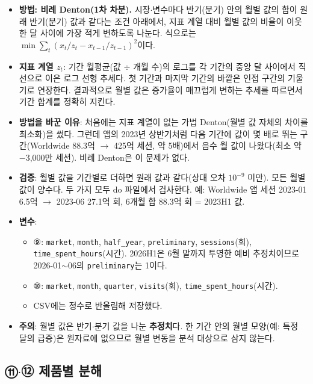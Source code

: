 \documentclass[11pt]{article}
\begin{document}
\begin{itemize}
  \item \textbf{방법: 비례 Denton(1차 차분).} 시장$\cdot$변수마다 반기(분기) 안의 월별 값의 합이 원래 반기(분기) 값과 같다는 조건 아래에서, 지표 계열 대비 월별 값의 비율이 이웃한 달 사이에 가장 적게 변하도록 나눈다. 식으로는 $\min \sum_t (x_t/z_t - x_{t-1}/z_{t-1})^2$이다.
  \item \textbf{지표 계열 $z_t$}: 기간 월평균(값 $\div$ 개월 수)의 로그를 각 기간의 중앙 달 사이에서 직선으로 이은 로그 선형 추세다. 첫 기간과 마지막 기간의 바깥은 인접 구간의 기울기로 연장한다. 결과적으로 월별 값은 증가율이 매끄럽게 변하는 추세를 따르면서 기간 합계를 정확히 지킨다.
  \item \textbf{방법을 바꾼 이유}: 처음에는 지표 계열이 없는 가법 Denton(월별 값 자체의 차이를 최소화)을 썼다. 그런데 앱의 2023년 상반기처럼 다음 기간에 값이 몇 배로 뛰는 구간(Worldwide 88.3억 $\to$ 425억 세션, 약 5배)에서 음수 월 값이 나왔다(최소 약 $-$3,000만 세션). 비례 Denton은 이 문제가 없다.
  \item \textbf{검증}: 월별 값을 기간별로 더하면 원래 값과 같다(상대 오차 $10^{-9}$ 미만). 모든 월별 값이 양수다. 두 가지 모두 do 파일에서 검사한다. 예: Worldwide 앱 세션 2023-01 6.5억 $\to$ 2023-06 27.1억 회, 6개월 합 88.3억 회 = 2023H1 값.
  \item \textbf{변수}:
  \begin{itemize}
    \item ⑨: \texttt{market}, \texttt{month}, \texttt{half\_year}, \texttt{preliminary}, \texttt{sessions}(회), \texttt{time\_spent\_hours}(시간). 2026H1은 6월 말까지 투영한 예비 추정치이므로 2026-01$\sim$06의 \texttt{preliminary}는 1이다.
    \item ⑩: \texttt{market}, \texttt{month}, \texttt{quarter}, \texttt{visits}(회), \texttt{time\_spent\_hours}(시간).
    \item CSV에는 정수로 반올림해 저장했다.
  \end{itemize}
  \item \textbf{주의}: 월별 값은 반기$\cdot$분기 값을 나눈 \textbf{추정치}다. 한 기간 안의 월별 모양(예: 특정 달의 급증)은 원자료에 없으므로 월별 변동을 분석 대상으로 삼지 않는다.
\end{itemize}

\subsection{⑪$\cdot$⑫ 제품별 분해}
\end{document}
